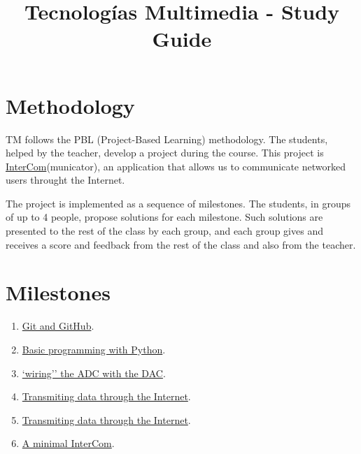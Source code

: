 \title{Tecnologías Multimedia - Study Guide}

\maketitle

\section{Methodology}
TM follows the PBL (Project-Based Learning) methodology. The students,
helped by the teacher, develop a project during the course. This
project
is \href{https://github.com/Tecnologias-multimedia/intercom}{InterCom}(municator),
an application that allows us to communicate networked users throught
the Internet.

The project is implemented as a sequence of milestones. The students,
in groups of up to 4 people, propose solutions for each
milestone. Such solutions are presented to the rest of the class by
each group, and each group gives and receives a score and feedback
from the rest of the class and also from the teacher.

\section{Milestones}
\begin{enumerate}
\item \href{https://tecnologias-multimedia.github.io/study_guide/milestone00/}{Git and GitHub}.
\item \href{https://tecnologias-multimedia.github.io/study_guide/milestone01/}{Basic programming with Python}.
\item \href{https://tecnologias-multimedia.github.io/study_guide/milestone02/}{`wiring'' the ADC with the DAC}.
\item \href{https://tecnologias-multimedia.github.io/study_guide/milestone03/}{Transmiting data through the Internet}.
\item \href{https://tecnologias-multimedia.github.io/study_guide/milestone04/}{Transmiting data through the Internet}.
\item \href{https://tecnologias-multimedia.github.io/study_guide/milestone05/}{A minimal InterCom}.
\end{enumerate}

